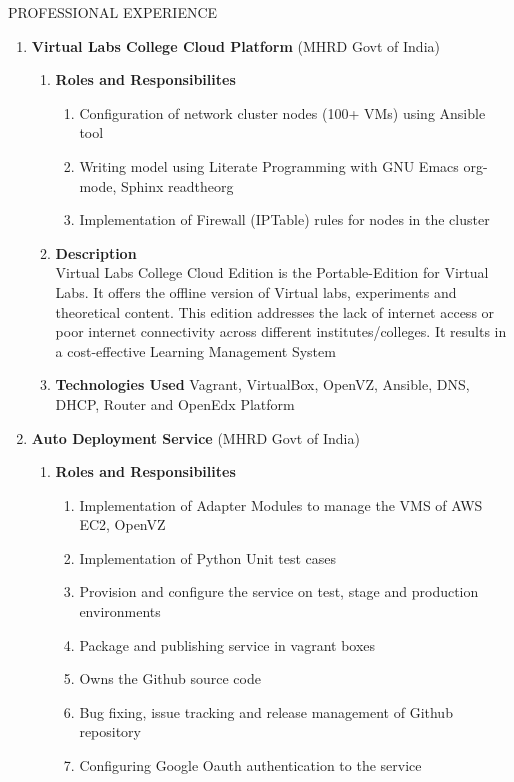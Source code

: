 \documentclass{resume} %
\newcommand{\blank}[1]{\hspace*{#1}}
\begin{document}
\begin{rSection}{PROFESSIONAL EXPERIENCE}
\begin{rSubsection}
\begin{enumerate}[label=\bfseries\arabic*]
\item \textbf {Virtual Labs College Cloud Platform} (MHRD Govt of India)
  \begin{enumerate}
    
  \item \textbf{Roles and Responsibilites }
    \begin{enumerate}
    \item Configuration of network cluster nodes (100+
      VMs) using Ansible tool
    \item Writing model using Literate Programming with GNU Emacs
      org-mode, Sphinx readtheorg
    \item Implementation of Firewall (IPTable) rules for nodes in the
      cluster
    \end{enumerate}
    
  \item \textbf{Description } \\ \blank{2 cm} Virtual Labs College
    Cloud Edition is the Portable-Edition for Virtual Labs. It offers
    the offline version of Virtual labs, experiments and theoretical
    content. This edition addresses the lack of internet access or
    poor internet connectivity across different
    institutes/colleges. It results in a cost-effective Learning
    Management System
    
  \item \textbf{Technologies Used } Vagrant, VirtualBox, OpenVZ,
    Ansible, DNS, DHCP, Router and OpenEdx Platform
  \end{enumerate}

\item \textbf {Auto Deployment Service} (MHRD Govt of India)
  \begin{enumerate}
    
  \item \textbf{Roles and Responsibilites}
    \begin{enumerate}
    \item Implementation of Adapter Modules to manage the VMS of AWS
      EC2, OpenVZ
    \item Implementation of Python Unit test cases
    \item Provision and configure the service on test, stage and
      production environments
    \item Package and publishing service in vagrant boxes
    \item Owns the Github source code
    \item Bug fixing, issue tracking and release management of Github
      repository
    \item Configuring Google Oauth authentication to the service
    \end{enumerate}
    

\end{enumerate}
\end{enumerate}
\end{rSubsection}
\end{rSection}
\end{document}
